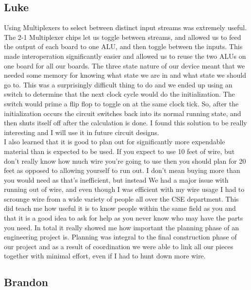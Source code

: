 \subsection{Luke}
Using Multiplexers to select between distinct input streams was extremely useful. The 2-1 Multiplexer chips let us toggle between streams, and allowed us to feed the output of each board to one ALU, and then toggle between the inputs. This made interoperation significantly easier and allowed us to reuse the two ALUs on one board for all our boards. The three state nature of our device meant that we needed some memory for knowing what state we are in and what state we should go to. This was a surprisingly difficult thing to do and we ended up using an switch to determine that the next clock cycle would do the initialization. The switch would prime a flip flop to toggle on at the same clock tick. So, after the initialization occurs the circuit switches back into its normal running state, and then shuts itself off after the calculation is done. I found this solution to be really interesting and I will use it in future circuit designs.\\


I also learned that it is good to plan out for significantly more expendable material than is expected to be used. If you expect to use 10 feet of wire, but don't really know how much wire you're going to use then you should plan for 20 feet as opposed to allowing yourself to run out. I don't mean buying more than you would need as that's inefficient, but instead  We had a major issue with running out of wire, and even though I was efficient with my wire usage I had to scrounge wire from a wide variety of people all over the CSE department. This did teach me how useful it is to know people within the same field as you and that it is a good idea to ask for help as you never know who may have the parts you need. In total it really showed me how important the planning phase of an engineering project is. Planning was integral to the final construction phase of our project and as a result of coordination we were able to link all our pieces together with minimal effort, even if I had to hunt down more wire.\\

 
\subsection{Brandon}
